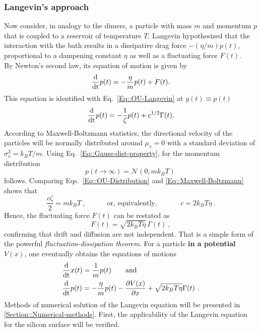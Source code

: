 	\subsubsection{Langevin's approach}
	Now consider, in analogy to the dimers, a particle with mass $m$ and momentum $p$ that is coupled to a reservoir of temperature $T$. Langevin hypothesized \cite{langevin1908theorie} that the interaction with the bath results in a dissipative drag force $- ({\eta}/{m}) p(t)$, proportional to a dampening constant $\eta$ as well as a fluctuating force $F(t)$. \\
	By Newton's second law, its equation of motion is given by
	\begin{equation}
		\frac{\text{d}}{\text{\text{d}t}} p(t) =	- \frac{\eta}{m} p(t) + F(t).
	\end{equation}
	This equation is identified with Eq.~\eqref{Eq::OU-Langevin} at $y(t) \equiv p(t)$
	\begin{equation}
		\frac{\text{d}}{\text{\text{d}t}} p(t) =	- \frac{1}{\zeta} p(t) + { c^{1/2}}{} \Gamma(t).
	\end{equation}
	According to Maxwell-Boltzmann statistics, the directional velocity of the particles will be normally distributed around $\mu_v = 0$ with a standard deviation of $\sigma_v^2 =	k_B T /	m$. Using Eq.~\eqref{Eq::Gauss-dist-property}, for the momentum distribution
	\begin{equation} \label{Eq::Maxwell-Boltzmann}
		p(t\rightarrow \infty) =	\mathcal{N}(0, m k_B T)~
	\end{equation}
	follows. Comparing Eqs.~\eqref{Eq::OU-Distribution} and \eqref{Eq::Maxwell-Boltzmann} shows that
	\begin{equation}
		\frac{c \zeta}{2} =	m k_B T~, \qquad \quad \text{or,  equivalently, } \qquad \quad c =	{2 k_B T \eta }~.
	\end{equation}
	Hence, the fluctuating force $F(t)$ can be restated as
	\begin{equation}
		F(t) =	\sqrt{2 k_B T \eta}\, \Gamma(t)~,
	\end{equation}
	confirming that drift and diffusion are not independent. That is a simple form of the powerful \textit{fluctuation-dissipation theorem}. For a particle \textbf{in a potential} $V(x)$, one eventually obtains the equations of motions
	\begin{align} \label{Eq::Langevin-eq-motion-set-x}
		&\frac{\text{d}}{\text{\text{d}t}} x(t) =	\frac{1}{m} p(t) \qquad \text{and}\\
		\label{Eq::Langevin-eq-motion-set-p}
		&\frac{\text{d}}{\text{\text{d}t}} p(t) =	- \frac{\eta}{m} p(t) - \frac{\partial V(x)}{\partial x} + \sqrt{2 k_B T \eta } \Gamma(t) ~.
	\end{align}
	Methods of numerical solution of the Langevin equation will be presented in \autoref{Section::Numerical-methods}. First, the applicability of the Langevin equation for the silicon surface will be verified.

